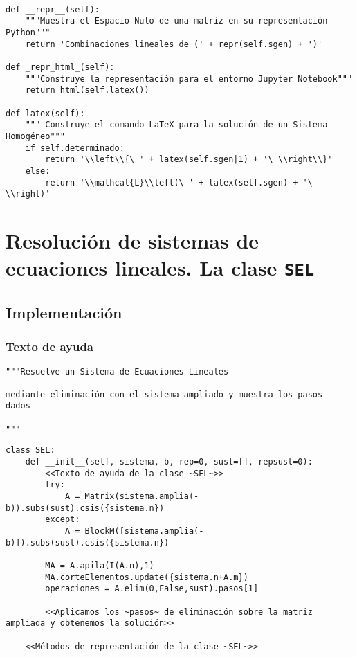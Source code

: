 \documentclass[11pt]{report}
\begin{document}
\begin{verbatim}

def __repr__(self):
    """Muestra el Espacio Nulo de una matriz en su representación Python"""
    return 'Combinaciones lineales de (' + repr(self.sgen) + ')'

def _repr_html_(self):
    """Construye la representación para el entorno Jupyter Notebook"""
    return html(self.latex())

def latex(self):
    """ Construye el comando LaTeX para la solución de un Sistema Homogéneo"""
    if self.determinado:
        return '\\left\\{\ ' + latex(self.sgen|1) + '\ \\right\\}'
    else:
        return '\\mathcal{L}\\left(\ ' + latex(self.sgen) + '\ \\right)' 

\end{verbatim}


\chapter{Resolución de sistemas de ecuaciones lineales. La clase  \texttt{SEL}}
\label{sec:org6fe37e2}

\section{Implementación}
\label{sec:org0e55099}
\subsection{Texto de ayuda}
\label{sec:orgfdc02bb}

\begin{verbatim}
"""Resuelve un Sistema de Ecuaciones Lineales

mediante eliminación con el sistema ampliado y muestra los pasos
dados

"""
\end{verbatim}

\begin{verbatim}
class SEL:
    def __init__(self, sistema, b, rep=0, sust=[], repsust=0):
        <<Texto de ayuda de la clase ~SEL~>>
        try:
            A = Matrix(sistema.amplia(-b)).subs(sust).csis({sistema.n})
        except:
            A = BlockM([sistema.amplia(-b)]).subs(sust).csis({sistema.n})
            
        MA = A.apila(I(A.n),1)
        MA.corteElementos.update({sistema.n+A.m})
        operaciones = A.elim(0,False,sust).pasos[1]
        
        <<Aplicamos los ~pasos~ de eliminación sobre la matriz ampliada y obtenemos la solución>>
        
    <<Métodos de representación de la clase ~SEL~>>
    
\end{verbatim}
\end{document}
